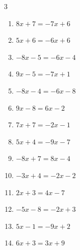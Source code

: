 \begin{multicols}{3}
\begin{enumerate}
\columnbreak %

  \item $8x+7=-7x+6$


  \item $5x+6=-6x+6$

        \phantom{$\displaystyle x=0$}

  \item $-8x-5=-6x-4$


  \item $9x-5=-7x+1$


  \item $-8x-4=-6x-8$

        \phantom{$\displaystyle x=2$}

  \item $9x-8=6x-2$

        \phantom{$\displaystyle x=2$}

  \item $7x+7=-2x-1$


  \item $5x+4=-9x-7$


  \item $-8x+7=8x-4$


  \item $-3x+4=-2x-2$

        \phantom{$\displaystyle x=6$}

  \item $2x+3=4x-7$

        \phantom{$\displaystyle x=5$}

  \item $-5x-8=-2x+3$


  \item $5x-1=-9x+2$


  \item $6x+3=3x+9$


\end{enumerate}
\end{multicols}
